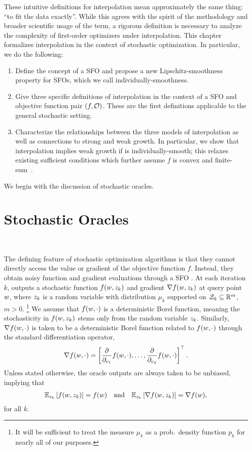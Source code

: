 These intuitive definitions for interpolation mean approximately the same thing: ``to fit the data exactly''. 
While this agrees with the spirit of the methodology and broader scientific usage of the term, a rigorous definition is necessary to analyze the complexity of first-order optimizers under interpolation. 
This chapter formalizes interpolation in the context of stochastic optimization. 
In particular, we do the following:
\begin{enumerate}
    \item Define the concept of a \ac{SFO} \oracle{} and propose a new Lipschitz-smoothness property for \acp{SFO}, which we call individually-smoothness. 
    \item Give three specific definitions of interpolation in the context of a \acl{SFO} and objective function pair \( \rbr{f, \oracle{}} \). 
    These are the first definitions applicable to the general stochastic setting.
    \item Characterize the relationships between the three models of interpolation as well as connections to strong and weak growth. 
In particular, we show that interpolation implies weak growth if \oracle{} is individually-smooth; this relaxes existing sufficient conditions which further assume \( f \) is convex and finite-sum~\citep{vaswani2019fast}. 
\end{enumerate}
We begin with the discussion of stochastic oracles.

\section{Stochastic Oracles}~\label{sec:stochastic-oracles}

The defining feature of stochastic optimization algorithms is that they cannot directly access the value or gradient of the objective function \( f \).
Instead, they obtain noisy function and gradient evaluations through a \ac{SFO}  \oracle. 
At each iteration \( k \), \oracle{} outputs a stochastic function \( f(\w, \zk) \) and gradient \( \grad(\w, \zk) \) at query point \( \w \), where \( \zk \) is a random variable with distribution \( \mu_k \) supported on \( \calZ_k \subseteq \R^m \), \( m > 0 \).%
\footnote{It will be sufficient to treat the measure \( \mu_k \) as a prob.\ density function \( p_k \) for nearly all of our purposes.}
We assume that \( f(\w, \cdot) \) is a deterministic Borel function, meaning the stochasticity in \( f(\w, \zk) \) stems only from the random variable \( \zk \).
Similarly, \( \grad(\w, \cdot) \) is taken to be a deterministic Borel function related to \( f(\w, \cdot) \) through the standard differentiation operator,
\[ \grad(\w, \cdot) = \sbr{\frac{\partial}{\partial_{v_1}} f(\w, \cdot), \ldots, \frac{\partial}{\partial_{v_d}} f(\w, \cdot)}^\top. \]
Unless stated otherwise, the oracle outputs are always taken to be unbiased, implying that 
\begin{align*}
    \E_{\zk} \sbr{f(\w, \zk)} = f(\w) \quad \text{and} \quad \Ek \sbr{\grad(\w, \zk)} = \grad(\w), 
\end{align*}
for all \( k \).

